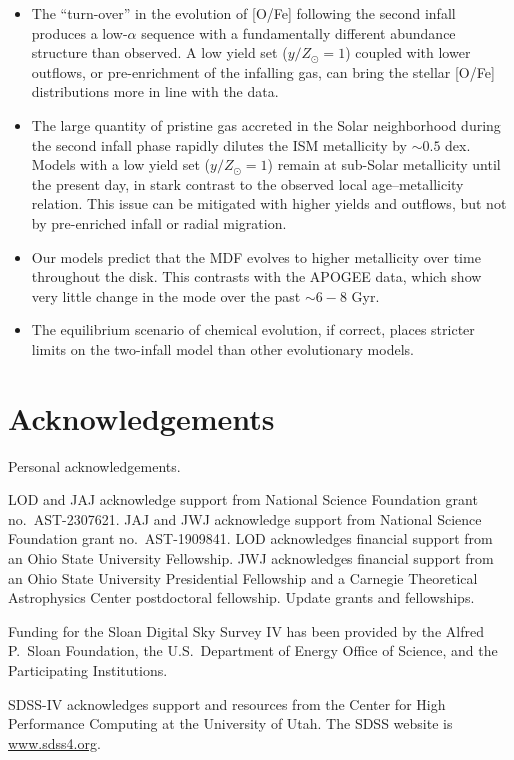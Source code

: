 \documentclass[twocolumn,twocolappendix,linenumbers]{aastex631}
\newcommand{\todo}[1]{{\color{red}#1}}
\begin{document}
\begin{itemize}
    \item The ``turn-over'' in the evolution of [O/Fe] following the second infall produces a low-$\alpha$ sequence with a fundamentally different abundance structure than observed. A low yield set ($y/Z_\odot=1$) coupled with lower outflows, or pre-enrichment of the infalling gas, can bring the stellar [O/Fe] distributions more in line with the data.
    \item The large quantity of pristine gas accreted in the Solar neighborhood during the second infall phase rapidly dilutes the ISM metallicity by $\sim0.5$ dex. Models with a low yield set ($y/Z_\odot=1$) remain at sub-Solar metallicity until the present day, in stark contrast to the observed local age--metallicity relation. This issue can be mitigated with higher yields and outflows, but not by pre-enriched infall or radial migration.
    \item Our models predict that the MDF evolves to higher metallicity over time throughout the disk. This contrasts with the APOGEE data, which show very little change in the mode over the past $\sim6-8$ Gyr.
    \item The equilibrium scenario of chemical evolution, if correct, places stricter limits on the two-infall model than other evolutionary models.
\end{itemize}

\section*{Acknowledgements}

\todo{Personal acknowledgements.}

LOD and JAJ acknowledge support from National Science Foundation grant no.\ AST-2307621. JAJ and JWJ acknowledge support from National Science Foundation grant no.\ AST-1909841.
LOD acknowledges financial support from an Ohio State University Fellowship.
JWJ acknowledges financial support from an Ohio State University Presidential Fellowship and a Carnegie Theoretical Astrophysics Center postdoctoral fellowship. \todo{Update grants and fellowships.}

Funding for the Sloan Digital Sky 
Survey IV has been provided by the 
Alfred P.\ Sloan Foundation, the U.S.\ 
Department of Energy Office of 
Science, and the Participating 
Institutions. 

SDSS-IV acknowledges support and 
resources from the Center for High 
Performance Computing  at the 
University of Utah. The SDSS 
website is \url{www.sdss4.org}.
\end{document}
